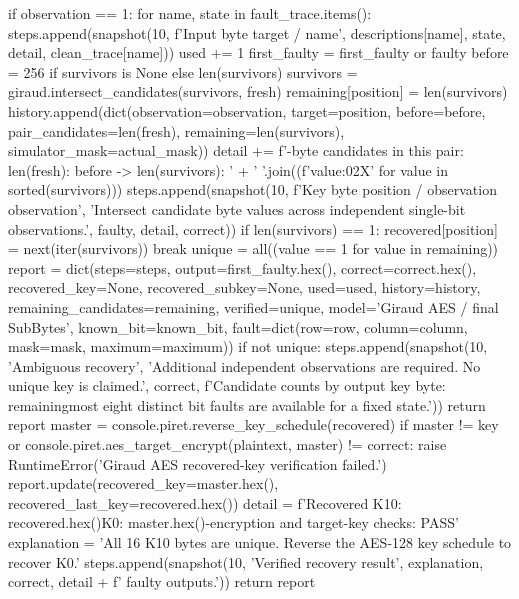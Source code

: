 \begin{lightcode}[numbers=left,firstnumber=1]
            if observation == 1:
                for name, state in fault_trace.items():
                    steps.append(snapshot(10, f'Input byte {target} / {name}', descriptions[name], state, detail, clean_trace[name]))
            used += 1
            first_faulty = first_faulty or faulty
            before = 256 if survivors is None else len(survivors)
            survivors = giraud.intersect_candidates(survivors, fresh)
            remaining[position] = len(survivors)
            history.append(dict(observation=observation, target=position, before=before, pair_candidates=len(fresh), remaining=len(survivors), simulator_mask=actual_mask))
            detail += f'\nKey-byte candidates in this pair: {len(fresh)}\nIntersection: {before} -> {len(survivors)}\nSurvivors: ' + ' '.join((f'{value:02X}' for value in sorted(survivors)))
            steps.append(snapshot(10, f'Key byte {position} / observation {observation}', 'Intersect candidate byte values across independent single-bit observations.', faulty, detail, correct))
            if len(survivors) == 1:
                recovered[position] = next(iter(survivors))
                break
    unique = all((value == 1 for value in remaining))
    report = dict(steps=steps, output=first_faulty.hex(), correct=correct.hex(), recovered_key=None, recovered_subkey=None, used=used, history=history, remaining_candidates=remaining, verified=unique, model='Giraud AES / final SubBytes', known_bit=known_bit, fault=dict(row=row, column=column, mask=mask, maximum=maximum))
    if not unique:
        steps.append(snapshot(10, 'Ambiguous recovery', 'Additional independent observations are required. No unique key is claimed.', correct, f'Candidate counts by output key byte: {remaining}\nAt most eight distinct bit faults are available for a fixed state.'))
        return report
    master = console.piret.reverse_key_schedule(recovered)
    if master != key or console.piret.aes_target_encrypt(plaintext, master) != correct:
        raise RuntimeError('Giraud AES recovered-key verification failed.')
    report.update(recovered_key=master.hex(), recovered_last_key=recovered.hex())
    detail = f'Recovered K10: {recovered.hex()}\nRecovered K0: {master.hex()}\nRe-encryption and target-key checks: PASS'
    explanation = 'All 16 K10 bytes are unique. Reverse the AES-128 key schedule to recover K0.'
    steps.append(snapshot(10, 'Verified recovery result', explanation, correct, detail + f' faulty outputs.'))
    return report



\end{lightcode}
